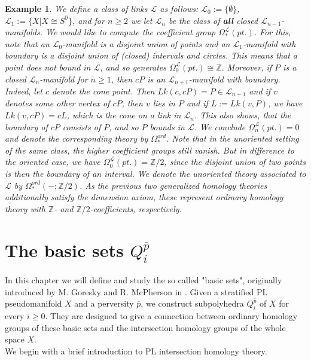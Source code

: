 \documentclass{scrreprt}
\newtheorem{example}[prop]{Example}
\begin{document}
\begin{example}\label{ordinaryhomologyexample}
We define a class of links $\mathcal{L}$ as follows: $\mathcal{L}_0 := \{ \emptyset \}$, $\mathcal{L}_1 := \{ X|X \cong S^0 \}$, and for $n \geq 2$ we let $\mathcal{L}_n$ be the class of \textbf{all} closed $\mathcal{L}_{n-1}$-manifolds. We would like to compute the coefficient group $\Omega_*^{\mathcal{L}}(pt.)$. For this, note that an $\mathcal{L}_0$-manifold is a disjoint union of points and an $\mathcal{L}_1$-manifold with boundary is a disjoint union of (closed) intervals and circles. This means that a point does not bound in $\mathcal{L}$, and so generates 
$\Omega_0^{\mathcal{L}}(pt.) \cong \mathbb{Z}.$ Moreover, if $P$ is a closed $\mathcal{L}_n$-manifold for $n \geq 1$, then $cP$ is an $\mathcal{L}_{n+1}$-manifold with boundary. Indeed, let $c$ denote the cone point. Then $Lk(c,cP)=P \in \mathcal{L}_{n+1}$ and if $v$ denotes some other vertex of $cP$, then $v$ lies in $P$ and if $L:=Lk(v,P)$, we have $Lk(v,cP)=cL$, which is the cone on a link in $\mathcal{L}_n$. This also shows, that the boundary of $cP$ consists of $P$, and so $P$ bounds in $\mathcal{L}$. We conclude $\Omega_n^{\mathcal{L}}(pt.)=0$ and denote the corresponding theory by $\Omega_*^{ord}$. Note that in the unoriented setting of the same class, the higher coefficient groups still vanish. But in difference to the oriented case, we have $\Omega_0^{\underline{\mathcal{L}}}(pt.)= \mathbb{Z}/2$, since the disjoint union of two points is then the boundary of an interval. We denote the unoriented theory associated to $\mathcal{L}$ by $\Omega_*^{ord}(-; \mathbb{Z}/2)$. As the previous two generalized homology theories additionally satisfy the dimension axiom, these represent ordinary homology theory with $\mathbb{Z}$- and $\mathbb{Z}/2$-coefficients, respectively.
\end{example}

\chapter{The basic sets $Q_i^{\overline{p}}$}
In this chapter we will define and study the so called "basic sets", originally introduced by M. Goresky and R. McPherson in \cite{GM}. Given a stratified PL pseudomanifold $X$ and a perversity $\overline{p}$, we construct subpolyhedra $Q_i^{\overline{p}}$ of $X$ for every $i \geq 0$. They are designed to give a connection between ordinary homology groups of these basic sets and the intersection homology groups of the whole space $X$. \\
We begin with a brief introduction to PL intersection homology theory.
\end{document}
